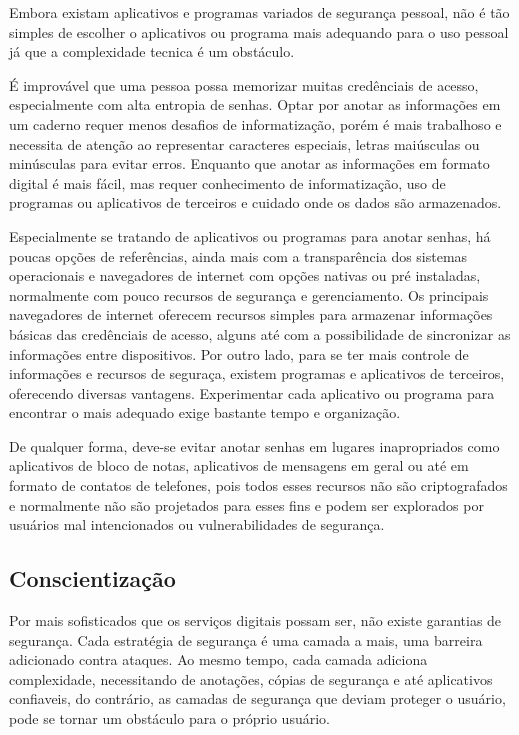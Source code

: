 \documentclass[12pt]{article}
\begin{document}
Embora existam aplicativos e programas variados de segurança pessoal, não é tão simples
de escolher o aplicativos ou programa mais adequando para o uso pessoal já que a
complexidade tecnica é um obstáculo.

É improvável que uma pessoa possa memorizar muitas credênciais de acesso, especialmente com
alta entropia de senhas.
Optar por anotar as informações em um caderno requer menos desafios de informatização, porém
é mais trabalhoso e necessita de atenção ao representar caracteres especiais, letras
maiúsculas ou minúsculas para evitar erros.
Enquanto que anotar as informações em formato digital é mais fácil, mas requer conhecimento
de informatização, uso de programas ou aplicativos de terceiros e cuidado onde os dados são
armazenados.

Especialmente se tratando de aplicativos ou programas para anotar senhas, há poucas
opções de referências, ainda mais com a transparência dos sistemas operacionais e
navegadores de internet com opções nativas ou pré instaladas, normalmente com pouco
recursos de segurança e gerenciamento.
Os principais navegadores de internet oferecem recursos simples para armazenar informações
básicas das credênciais de acesso, alguns até com a possibilidade de sincronizar as informações
entre dispositivos.
Por outro lado, para se ter mais controle de informações e recursos de seguraça, existem
programas e aplicativos de terceiros, oferecendo diversas vantagens.
Experimentar cada aplicativo ou programa para encontrar o mais adequado exige bastante tempo
e organização.

De qualquer forma, deve-se evitar anotar senhas em lugares inapropriados como aplicativos de
bloco de notas, aplicativos de mensagens em geral ou até em formato de contatos de telefones,
pois todos esses recursos não são criptografados e normalmente não são projetados para esses
fins e podem ser explorados por usuários mal intencionados ou vulnerabilidades de segurança.

\subsection{Conscientização}

Por mais sofisticados que os serviços digitais possam ser, não existe garantias de segurança.
Cada estratégia de segurança é uma camada a mais, uma barreira adicionado contra ataques.
Ao mesmo tempo, cada camada adiciona complexidade, necessitando de anotações, cópias de
segurança e até aplicativos confiaveis, do contrário, as camadas de segurança que deviam
proteger o usuário, pode se tornar um obstáculo para o próprio usuário.
\end{document}
